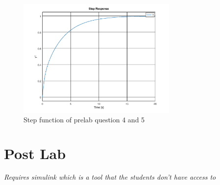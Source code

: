 \documentclass[12pt, a4paper]{article}
\begin{document}
			\begin{figure}[H]
				\centering
				\includegraphics[width=0.7\textwidth]{Images/question_4_2_lab.png}
				\caption{Step function of prelab question 4 and 5}
				\label{fig:4_2} 
			\end{figure}
		

		\section{Post Lab} %
		\label{sec:post_lab}
		\textit{Requires simulink which is a tool that the students don't have access to}
		
\end{document}

